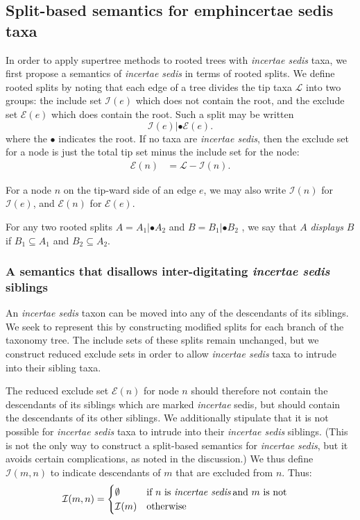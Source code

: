 \documentclass[english]{article}
\begin{document}
\subsection{Split-based semantics for emph{incertae sedis} taxa}

In order to apply supertree methods to rooted trees with
\emph{incertae sedis} taxa, we first propose a semantics of
\emph{incertae sedis }in terms of rooted splits. We define rooted
splits by noting that each edge of a tree divides the tip taxa
$\mathcal{L}$ into two groups: the include set $\mathcal{I}(e)$ which
does not contain the root, and the exclude set $\mathcal{E}(e)$ which
does contain the root. Such a split may be written \[
\mathcal{I}(e)|\bullet\mathcal{E}(e). \] where the $\bullet$ indicates
the root. If no taxa are \emph{incertae sedis}, then the exclude set
for a node is just the total tip set minus the include set for the
node: \begin{align*} \mathcal{E}(n) & =\mathcal{L}-\mathcal{I}(n).
\end{align*}

For a node $n$ on the tip-ward side of an edge $e$, we may also write
$\mathcal{I}(n)$ for $\mathcal{I}(e)$, and $\mathcal{E}(n)$ for
$\mathcal{E}(e)$.

For any two rooted splits $A=A_{1}|\bullet A_{2}$ and $B=B_{1}|\bullet
B_{2}$ , we say that $A$ \emph{displays }$B$ if $B_{1}\subseteq A_{1}$
and $B_{2}\subseteq A_{2}$.

\subsubsection{A semantics that disallows inter-digitating
\emph{incertae sedis} siblings}

An \emph{incertae sedis} taxon can be moved into any of the
descendants of its siblings. We seek to represent this by constructing
modified splits for each branch of the taxonomy tree. The include sets
of these splits remain unchanged, but we construct reduced exclude
sets in order to allow \emph{incertae sedis} taxa to intrude into
their sibling taxa.

The reduced exclude set $\mathcal{E}(n)$ for node $n$ should therefore
not contain the descendants of its siblings which are marked
\emph{incertae }sedis\emph{,} but should contain the descendants of
its other siblings\emph{. }We additionally stipulate that it is not
possible for \emph{incertae sedis} taxa to intrude into their
\emph{incertae sedis} siblings. (This is not the only way to construct
a split-based semantics for \emph{incertae sedis}, but it avoids
certain complications, as noted in the discussion.) We thus define
$\mathcal{I}(m,n)$ to indicate descendants of $m$ that are excluded
from $n$. Thus: \begin{align*} \mathcal{I}(m,n) & =\begin{cases}
\emptyset & \text{if }n\text{ is \emph{incertae sedis}\,and }m\text{
is not}\\ \mathcal{I}(m) & \text{otherwise} \end{cases} \end{align*}
\end{document}

